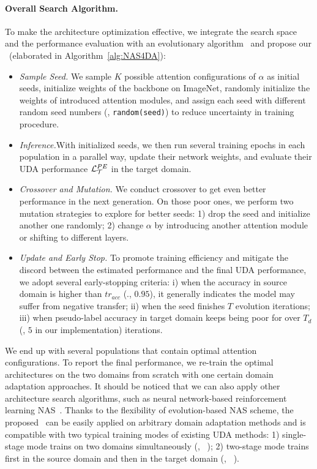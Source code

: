 \documentclass[10pt,twocolumn,letterpaper]{article}
\begin{document}
\paragraph{Overall Search Algorithm.}
To make the architecture optimization effective, we integrate the search space and the performance evaluation with an evolutionary algorithm~\cite{back1996evolutionary} and propose our \iMethod\  (elaborated in Algorithm~\ref{alg:NAS4DA}):
\begin{itemize}[leftmargin=*]
    \setlength{\itemsep}{0pt}
    \setlength{\parsep}{0pt}
    \item \textit{Sample Seed.}
    We sample $K$ possible attention configurations of $\alpha$ as initial seeds, initialize weights of the backbone on ImageNet, randomly initialize the weights of introduced attention modules, and assign each seed with different random seed numbers (\eg, \texttt{random(seed)}) to reduce uncertainty in training procedure.

    \item \textit{Inference.}With initialized seeds, we then run several training epochs in each population in a parallel way, update their network weights, and evaluate their UDA performance $\mathcal{L}^{PE}_{\mathcal{T}}$ in the target domain.

    \item \textit{Crossover and Mutation.} We conduct crossover to get even better performance in the next generation. On those poor ones, we perform two mutation strategies to explore for better seeds: 1) drop the seed and initialize another one randomly; 2) change $\alpha$ by introducing another attention module or shifting to different layers.

    \item \textit{Update and Early Stop.} To promote training efficiency and mitigate the discord between the estimated performance and the final UDA performance, we adopt several early-stopping criteria: i) when the accuracy in source domain is higher than $tr_{acc}$ (\eg., $0.95$), it generally indicates the model may suffer from negative transfer;
    ii) when the seed finishes $T$ evolution iterations;
    iii) when pseudo-label accuracy in target domain keeps being poor for over $T_{d}$ (\eg, $5$ in our implementation) iterations.
\end{itemize}

We end up with several populations that contain optimal attention configurations.
To report the final performance, we re-train the optimal architectures on the two domains from scratch with one certain domain adaptation approaches.
It should be noticed that we can also apply other architecture search algorithms, such as neural network-based reinforcement learning NAS~\cite{zoph2018NASNet}.
Thanks to the flexibility of evolution-based NAS scheme, the proposed \iMethod\  can be easily applied on arbitrary domain adaptation methods and is compatible with two typical training modes of existing UDA methods: 1) single-stage mode trains on two domains simultaneously (\eg, ~\cite{long2018CDAN,wang2020PAN}); 2) two-stage mode trains first in the source domain and then in the target domain (\eg, ~\cite{liang2020shot,ge2020MMT}).
\end{document}
